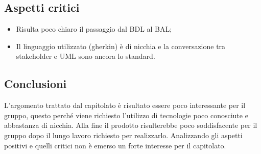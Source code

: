 \subsection{Aspetti critici}
\begin{itemize}
\item Risulta poco chiaro il passaggio dal BDL al BAL;
\item Il linguaggio utilizzato (gherkin) è di nicchia e la conversazione tra stakeholder e UML sono ancora lo standard.
\end{itemize}

\subsection{Conclusioni}
L'argomento trattato dal capitolato è risultato essere poco interessante per il gruppo, questo perché viene richiesto l'utilizzo di tecnologie poco conosciute e abbastanza di nicchia. Alla fine il prodotto risulterebbe poco soddisfacente per il gruppo dopo il lungo lavoro richiesto per realizzarlo.
Analizzando gli aspetti positivi e quelli critici non è emerso un forte interesse per il capitolato.